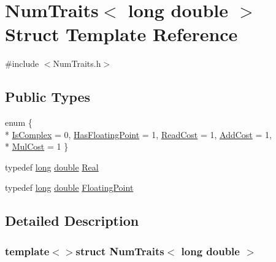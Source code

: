 \hypertarget{struct_num_traits_3_01long_01double_01_4}{\section{Num\-Traits$<$ long double $>$ Struct Template Reference}
\label{struct_num_traits_3_01long_01double_01_4}
}


{\ttfamily \#include $<$Num\-Traits.\-h$>$}

\subsection*{Public Types}
\begin{DoxyCompactItemize}
\item 
enum \{ \\*
\hyperlink{struct_num_traits_3_01long_01double_01_4_a7d44fc654578e5eba7d7dc40271b7c1fa06dfd29dd4ecdf34668cf59d1541b73b}{Is\-Complex} = 0, 
\hyperlink{struct_num_traits_3_01long_01double_01_4_a7d44fc654578e5eba7d7dc40271b7c1fae6e4a0fc63bf740359c76805bc128f81}{Has\-Floating\-Point} = 1, 
\hyperlink{struct_num_traits_3_01long_01double_01_4_a7d44fc654578e5eba7d7dc40271b7c1fa076fa34f499259aea17308f4f33c4127}{Read\-Cost} = 1, 
\hyperlink{struct_num_traits_3_01long_01double_01_4_a7d44fc654578e5eba7d7dc40271b7c1fadd95669a80db8b5ea3a050edf42409f1}{Add\-Cost} = 1, 
\\*
\hyperlink{struct_num_traits_3_01long_01double_01_4_a7d44fc654578e5eba7d7dc40271b7c1fa1df54ec18ff72f8243f8a6d8adc05df0}{Mul\-Cost} = 1
 \}
\item 
typedef \hyperlink{ioapi_8h_a3c7b35ad9dab18b8310343c201f7b27e}{long} \hyperlink{_super_l_u_support_8h_a8956b2b9f49bf918deed98379d159ca7}{double} \hyperlink{struct_num_traits_3_01long_01double_01_4_adf288ae9ac1093dfe8645cc202ba5e1e}{Real}
\item 
typedef \hyperlink{ioapi_8h_a3c7b35ad9dab18b8310343c201f7b27e}{long} \hyperlink{_super_l_u_support_8h_a8956b2b9f49bf918deed98379d159ca7}{double} \hyperlink{struct_num_traits_3_01long_01double_01_4_a13ad4b53be61a6f04ca51a2e7d03d405}{Floating\-Point}
\end{DoxyCompactItemize}


\subsection{Detailed Description}
\subsubsection*{template$<$$>$struct Num\-Traits$<$ long double $>$}



